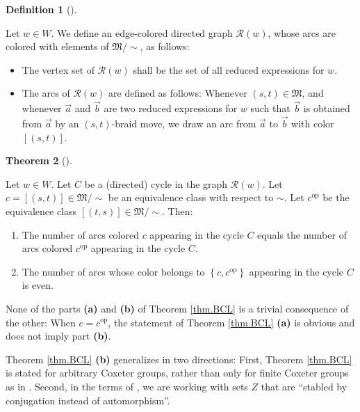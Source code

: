 \documentclass[numbers=enddot,12pt,final,onecolumn,notitlepage,abstracton]{scrartcl}%
\theoremstyle{definition}
\newtheorem{theo}{Theorem}[section]
\newenvironment{theorem}[1][]
{\begin{theo}[#1]\begin{leftbar}}
{\end{leftbar}\end{theo}}
\newtheorem{defi}[theo]{Definition}
\newenvironment{definition}[1][]
{\begin{defi}[#1]\begin{leftbar}}
{\end{leftbar}\end{defi}}
\begin{document}
\begin{definition}
\label{def.R}Let $w\in W$. We define an edge-colored directed graph
$\mathcal{R}\left(  w\right)  $, whose arcs are colored with elements of
$\mathfrak{M}/\sim$, as follows:

\begin{itemize}
\item The vertex set of $\mathcal{R}\left(  w\right)  $ shall be the set of
all reduced expressions for $w$.

\item The arcs of $\mathcal{R}\left(  w\right)  $ are defined as follows:
Whenever $\left(  s,t\right)  \in\mathfrak{M}$, and whenever
$\overrightarrow{a}$ and $\overrightarrow{b}$ are two reduced expressions for
$w$ such that $\overrightarrow{b}$ is obtained from $\overrightarrow{a}$ by an
$\left(  s,t\right)  $-braid move, we draw an arc from $\overrightarrow{a}$ to
$\overrightarrow{b}$ with color $\left[  \left(  s,t\right)  \right]  $.
\end{itemize}
\end{definition}


\begin{theorem}
\label{thm.BCL}Let $w\in W$. Let $C$ be a (directed) cycle in the graph
$\mathcal{R}\left(  w\right)  $. Let $c=\left[  \left(  s,t\right)  \right]
\in\mathfrak{M}/\sim$ be an equivalence class with respect to $\sim$. Let
$c^{\operatorname*{op}}$ be the equivalence class $\left[  \left(  t,s\right)
\right]  \in\mathfrak{M}/\sim$. Then:

\begin{enumerate}
\item[\textbf{(a)}] The number of arcs colored $c$ appearing in the cycle $C$
equals the number of arcs colored $c^{\operatorname*{op}}$ appearing in the
cycle $C$.

\item[\textbf{(b)}] The number of arcs whose color belongs to $\left\{
c,c^{\operatorname*{op}}\right\}  $ appearing in the cycle $C$ is even.
\end{enumerate}
\end{theorem}


None of the parts \textbf{(a)} and \textbf{(b)} of Theorem \ref{thm.BCL} is a
trivial consequence of the other: When $c=c^{\operatorname*{op}}$, the
statement of Theorem \ref{thm.BCL} \textbf{(a)} is obvious and does not imply
part \textbf{(b)}.

Theorem \ref{thm.BCL} \textbf{(b)} generalizes \cite[Theorem 3.1]{BCL} in two
directions: First, Theorem \ref{thm.BCL} is stated for arbitrary Coxeter
groups, rather than only for finite Coxeter groups as in \cite{BCL}. Second,
in the terms of \cite[Remark 3.3]{BCL}, we are working with sets $Z$ that are
\textquotedblleft stabled by conjugation instead of
automorphism\textquotedblright.
\end{document}
